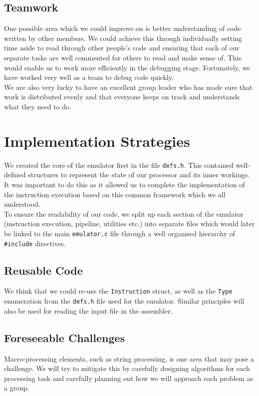 \documentclass[11pt]{article}
\begin{document}
\subsection{Teamwork}
One possible area which we could improve on is better understanding of code written by other members. We could achieve this through individually setting time aside to read through other people's code and ensuring that each of our separate tasks are well commented for others to read and make sense of. This would enable us to work more efficiently in the debugging stage. Fortunately, we have worked very well as a team to debug code quickly.\\

We are also very lucky to have an excellent group leader who has made sure that work is distributed evenly and that everyone keeps on track and understands what they need to do.

\section{Implementation Strategies}
We created the core of the emulator first in the file \texttt{defs.h}. This contained well-defined structures to represent the state of our processor and its inner workings. It was important to do this as it allowed us to complete the implementation of the instruction execution based on this common framework which we all understood.\\

To ensure the readability of our code, we split up each section of the emulator (instruction execution, pipeline, utilities etc.) into separate files which would later be linked to the main \texttt{emulator.c} file through a well organised hierarchy of \texttt{{\#}include} directives.

\subsection{Reusable Code}

We think that we could re-use the \texttt{Instruction} struct, as well as the \texttt{Type} enumeration from the \texttt{defs.h} file used for the emulator. Similar principles will also be used for reading the input file in the assembler.

\subsection{Foreseeable Challenges}
Macro-processing elements, such as string processing, is one area that may pose a challenge. We will try to mitigate this by carefully designing algorithms for each processing task and carefully planning out how we will approach each problem as a group.
\end{document}
